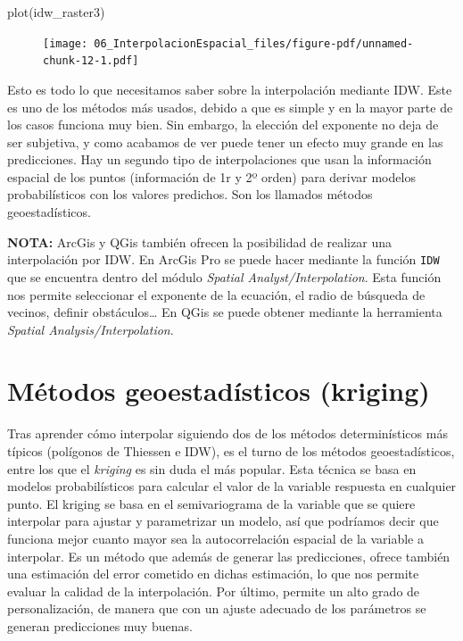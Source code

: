 \documentclass[
  letterpaper,
  DIV=11,
  numbers=noendperiod]{scrreprt}
\newenvironment{Shaded}{\begin{snugshade}}{\end{snugshade}}
\newcommand{\FunctionTok}[1]{\textcolor[rgb]{0.28,0.35,0.67}{#1}}
\newcommand{\NormalTok}[1]{\textcolor[rgb]{0.00,0.23,0.31}{#1}}
\begin{document}
\begin{Shaded}
\begin{Highlighting}[]
\FunctionTok{plot}\NormalTok{(idw\_raster3)}
\end{Highlighting}
\end{Shaded}

\begin{figure}[H]

{\centering \texttt{[image: 06\_InterpolacionEspacial\_files/figure-pdf/unnamed-chunk-12-1.pdf]}

}

\end{figure}

Esto es todo lo que necesitamos saber sobre la interpolación mediante
IDW. Este es uno de los métodos más usados, debido a que es simple y en
la mayor parte de los casos funciona muy bien. Sin embargo, la elección
del exponente no deja de ser subjetiva, y como acabamos de ver puede
tener un efecto muy grande en las predicciones. Hay un segundo tipo de
interpolaciones que usan la información espacial de los puntos
(información de 1r y 2º orden) para derivar modelos probabilísticos con
los valores predichos. Son los llamados métodos geoestadísticos.

\textbf{NOTA:} ArcGis y QGis también ofrecen la posibilidad de realizar
una interpolación por IDW. En ArcGis Pro se puede hacer mediante la
función \texttt{IDW} que se encuentra dentro del módulo \emph{Spatial
Analyst/Interpolation}. Esta función nos permite seleccionar el
exponente de la ecuación, el radio de búsqueda de vecinos, definir
obstáculos\ldots{} En QGis se puede obtener mediante la herramienta
\emph{Spatial Analysis/Interpolation}.

\hypertarget{muxe9todos-geoestaduxedsticos-kriging}{%
\section{Métodos geoestadísticos
(kriging)}\label{muxe9todos-geoestaduxedsticos-kriging}}

Tras aprender cómo interpolar siguiendo dos de los métodos
determinísticos más típicos (polígonos de Thiessen e IDW), es el turno
de los métodos geoestadísticos, entre los que el \emph{kriging} es sin
duda el más popular. Esta técnica se basa en modelos probabilísticos
para calcular el valor de la variable respuesta en cualquier punto. El
kriging se basa en el semivariograma de la variable que se quiere
interpolar para ajustar y parametrizar un modelo, así que podríamos
decir que funciona mejor cuanto mayor sea la autocorrelación espacial de
la variable a interpolar. Es un método que además de generar las
predicciones, ofrece también una estimación del error cometido en dichas
estimación, lo que nos permite evaluar la calidad de la interpolación.
Por último, permite un alto grado de personalización, de manera que con
un ajuste adecuado de los parámetros se generan predicciones muy buenas.
\end{document}
